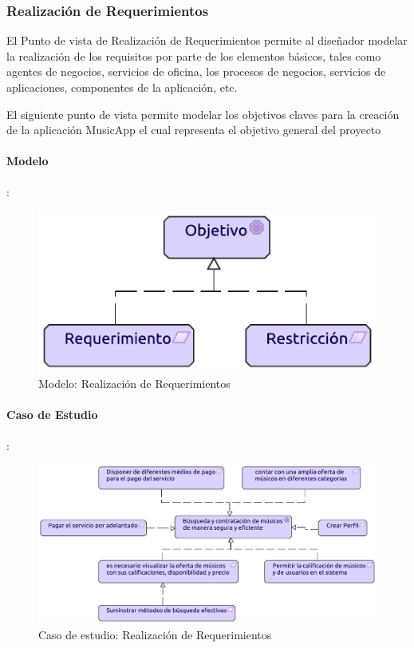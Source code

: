 \newpage

\subsubsection{Realización de Requerimientos}
El Punto de vista de Realización de Requerimientos permite al diseñador modelar la realización de los requisitos por parte de los elementos básicos, tales como agentes de negocios, servicios de oficina, los procesos de negocios, servicios de aplicaciones, componentes de la aplicación, etc.  \vspace{\baselineskip}

El siguiente punto de vista permite modelar los objetivos claves para la creación de la aplicación MusicApp el cual representa el objetivo general del proyecto

\paragraph{Modelo}:
\begin{figure}[h!]
	\centering
	\includegraphics[width=0.8\linewidth]{Desarrollo/ArquitecturaEmpresarial/Motivacion/imgs/RealizacionMetamodelo.pdf}
	\caption{Modelo: Realización de Requerimientos}
\end{figure}
\newpage
\paragraph{Caso de Estudio}:
\begin{figure}[h!]
	\centering
	\includegraphics[width=\linewidth]{Desarrollo/ArquitecturaEmpresarial/Motivacion/imgs/Realizacion.pdf}
	\caption{Caso de estudio: Realización de Requerimientos}
\end{figure}

